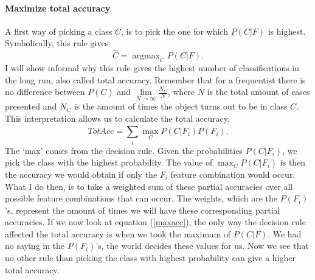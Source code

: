 \documentclass{report}
\DeclareMathOperator*{\argmax}{argmax}
\theoremstyle{definition}
\begin{document}
\paragraph*{Maximize total accuracy}
A first way of picking a class $C$, is to pick the one for which $P(C|F)$ is highest. Symbolically, this rule gives
\begin{equation} \label{maxtotalaccuracy}
\hat{C}=\argmax_C P(C|F).
\end{equation}
I will show informal why this rule gives the highest number of classifications in the long run, also called total accuracy. Remember that for a frequentist there is no difference between $P(C)$ and $\lim\limits_{N \rightarrow \infty}\frac{N_C}{N}$, where $N$ is the total amount of cases presented and $N_C$ is the amount of times the object turns out to be in class $C$. This interpretation allows us to calculate the total accuracy,
\begin{equation} \label{maxacc}
TotAcc = \sum_{i}^{} \max_C P(C|F_i) P(F_i).
\end{equation}
The \lq max' comes from the decision rule. Given the probabilities $P(C|F_i)$, we pick the class with the highest probability. The value of $\max_C P(C|F_i)$ is then the accuracy we would obtain if only the $F_i$ feature combination would occur. What I do then, is to take a weighted sum of these partial accuracies over all possible feature combinations that can occur. The weights, which are the $P(F_i)$'s, represent the amount of times we will have these corresponding partial accuracies. If we now look at equation (\ref{maxacc}), the only way the decision rule affected the total accuracy is when we took the maximum of $P(C|F)$. We had no saying in the $P(F_i)$'s, the world decides these values for us. Now we see that no other rule than picking the class with highest probability can give a higher total accuracy.
\end{document}
